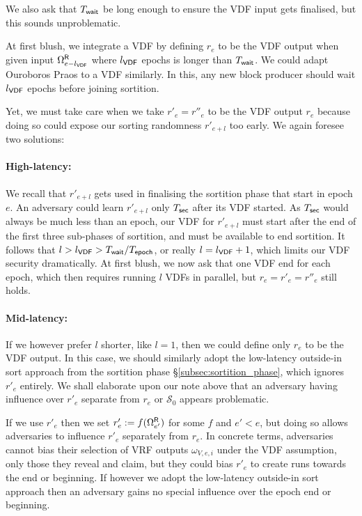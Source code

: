 We also ask that $T_{\mathsf{wait}}$ be long enough to ensure the VDF input gets finalised, but this sounds unproblematic.  

At first blush, we integrate a VDF by defining $r_e$ to be the VDF output when given input $\Omega^{\mathsf{R}}_{e-l_{\mathsf{VDF}}}$ where $l_{\mathsf{VDF}}$ epochs is longer than $T_{\mathsf{wait}}$.  We could adapt Ouroboros Praos \cite{Praos} to a VDF similarly.  In this, any new block producer should wait $l_{\mathsf{VDF}}$ epochs before joining sortition. 

Yet, we must take care when we take $r'_e = r''_e$ to be the VDF output $r_e$ because doing so could expose our sorting randomness $r'_{e+l}$ too early.  We again foresee two solutions:

\paragraph{High-latency:} 
We recall that $r'_{e+l}$ gets used in finalising the sortition phase that start in epoch $e$.  An adversary could learn $r'_{e+l}$ only $T_{\mathsf{sec}}$ after its VDF started.  As $T_{\mathsf{sec}}$ would always be much less than an epoch, our VDF for $r'_{e+l}$ must start after the end of the first three sub-phases of sortition, and must be available to end sortition.  It follows that $l > l_{\mathsf{VDF}} > T_{\mathsf{wait}}/T_{\mathsf{epoch}}$, or really $l = l_{\mathsf{VDF}} + 1$, which limits our VDF security dramatically.  At first blush, we now ask that one VDF end for each epoch, which then requires running $l$ VDFs in parallel, but $r_e = r'_e = r''_e$ still holds.

\paragraph{Mid-latency:} 
If we however prefer $l$ shorter, like $l=1$, then we could define only $r_e$ to be the VDF output.  In this case, we should similarly adopt the low-latency outside-in sort approach from the sortition phase \S\ref{subsec:sortition_phase}, which ignores $r'_e$ entirely.  We shall elaborate upon our note above that an adversary having influence over $r'_e$ separate from $r_e$ or $\mathcal{S}_0$ appears problematic.

If we use $r'_e$ then we set $r'_e := f(\Omega^{\mathsf{R}}_{e'})$ for some $f$ and $e' < e$, but doing so allows adversaries to influence $r'_e$ separately from $r_e$.  In concrete terms, adversaries cannot bias their selection of VRF outputs $\omega_{V,e,i}$ under the VDF assumption, only those they reveal and claim, but they could bias $r'_e$ to create runs towards the end or beginning.  If however we adopt the low-latency outside-in sort approach then an adversary gains no special influence over the epoch end or beginning. 


